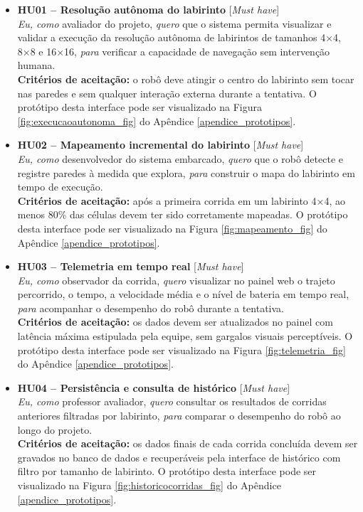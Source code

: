 \begin{itemize}

\item \textbf{HU01 – Resolução autônoma do labirinto} [\textit{Must have}]\\
\textit{Eu, como} avaliador do projeto, \textit{quero} que o sistema permita visualizar e validar a execução da resolução autônoma de labirintos de tamanhos 4×4, 8×8 e 16×16, \textit{para} verificar a capacidade de navegação sem intervenção humana.\\
\textbf{Critérios de aceitação:} o robô deve atingir o centro do labirinto sem tocar nas paredes e sem qualquer interação externa durante a tentativa. O protótipo desta interface pode ser visualizado na Figura \ref{fig:execucaoautonoma_fig} do Apêndice \ref{apendice_prototipos}.

\item \textbf{HU02 – Mapeamento incremental do labirinto} [\textit{Must have}]\\
\textit{Eu, como} desenvolvedor do sistema embarcado, \textit{quero} que o robô detecte e registre paredes à medida que explora, \textit{para} construir o mapa do labirinto em tempo de execução.\\
\textbf{Critérios de aceitação:} após a primeira corrida em um labirinto 4×4, ao menos 80\% das células devem ter sido corretamente mapeadas. O protótipo desta interface pode ser visualizado na Figura \ref{fig:mapeamento_fig} do Apêndice \ref{apendice_prototipos}.

\item \textbf{HU03 – Telemetria em tempo real} [\textit{Must have}]\\
\textit{Eu, como} observador da corrida, \textit{quero} visualizar no painel web o trajeto percorrido, o tempo, a velocidade média e o nível de bateria em tempo real, \textit{para} acompanhar o desempenho do robô durante a tentativa.\\
\textbf{Critérios de aceitação:} os dados devem ser atualizados no painel com latência máxima estipulada pela equipe, sem gargalos visuais perceptíveis. O protótipo desta interface pode ser visualizado na Figura \ref{fig:telemetria_fig} do Apêndice \ref{apendice_prototipos}.

\item \textbf{HU04 – Persistência e consulta de histórico} [\textit{Must have}]\\
\textit{Eu, como} professor avaliador, \textit{quero} consultar os resultados de corridas anteriores filtradas por labirinto, \textit{para} comparar o desempenho do robô ao longo do projeto.\\
\textbf{Critérios de aceitação:} os dados finais de cada corrida concluída devem ser gravados no banco de dados e recuperáveis pela interface de histórico com filtro por tamanho de labirinto. O protótipo desta interface pode ser visualizado na Figura \ref{fig:historicocorridas_fig} do Apêndice \ref{apendice_prototipos}.


\end{itemize}
